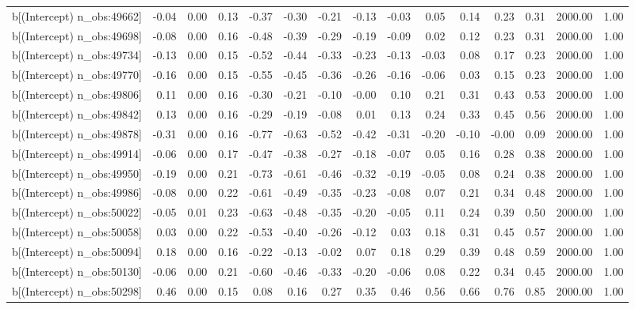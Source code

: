 \begin{table}[ht]
\begin{tabular}{rrrrrrrrrrrrrrr}
  b[(Intercept) n\_obs:49662] & -0.04 & 0.00 & 0.13 & -0.37 & -0.30 & -0.21 & -0.13 & -0.03 & 0.05 & 0.14 & 0.23 & 0.31 & 2000.00 & 1.00 \\ 
  b[(Intercept) n\_obs:49698] & -0.08 & 0.00 & 0.16 & -0.48 & -0.39 & -0.29 & -0.19 & -0.09 & 0.02 & 0.12 & 0.23 & 0.31 & 2000.00 & 1.00 \\ 
  b[(Intercept) n\_obs:49734] & -0.13 & 0.00 & 0.15 & -0.52 & -0.44 & -0.33 & -0.23 & -0.13 & -0.03 & 0.08 & 0.17 & 0.23 & 2000.00 & 1.00 \\ 
  b[(Intercept) n\_obs:49770] & -0.16 & 0.00 & 0.15 & -0.55 & -0.45 & -0.36 & -0.26 & -0.16 & -0.06 & 0.03 & 0.15 & 0.23 & 2000.00 & 1.00 \\ 
  b[(Intercept) n\_obs:49806] & 0.11 & 0.00 & 0.16 & -0.30 & -0.21 & -0.10 & -0.00 & 0.10 & 0.21 & 0.31 & 0.43 & 0.53 & 2000.00 & 1.00 \\ 
  b[(Intercept) n\_obs:49842] & 0.13 & 0.00 & 0.16 & -0.29 & -0.19 & -0.08 & 0.01 & 0.13 & 0.24 & 0.33 & 0.45 & 0.56 & 2000.00 & 1.00 \\ 
  b[(Intercept) n\_obs:49878] & -0.31 & 0.00 & 0.16 & -0.77 & -0.63 & -0.52 & -0.42 & -0.31 & -0.20 & -0.10 & -0.00 & 0.09 & 2000.00 & 1.00 \\ 
  b[(Intercept) n\_obs:49914] & -0.06 & 0.00 & 0.17 & -0.47 & -0.38 & -0.27 & -0.18 & -0.07 & 0.05 & 0.16 & 0.28 & 0.38 & 2000.00 & 1.00 \\ 
  b[(Intercept) n\_obs:49950] & -0.19 & 0.00 & 0.21 & -0.73 & -0.61 & -0.46 & -0.32 & -0.19 & -0.05 & 0.08 & 0.24 & 0.38 & 2000.00 & 1.00 \\ 
  b[(Intercept) n\_obs:49986] & -0.08 & 0.00 & 0.22 & -0.61 & -0.49 & -0.35 & -0.23 & -0.08 & 0.07 & 0.21 & 0.34 & 0.48 & 2000.00 & 1.00 \\ 
  b[(Intercept) n\_obs:50022] & -0.05 & 0.01 & 0.23 & -0.63 & -0.48 & -0.35 & -0.20 & -0.05 & 0.11 & 0.24 & 0.39 & 0.50 & 2000.00 & 1.00 \\ 
  b[(Intercept) n\_obs:50058] & 0.03 & 0.00 & 0.22 & -0.53 & -0.40 & -0.26 & -0.12 & 0.03 & 0.18 & 0.31 & 0.45 & 0.57 & 2000.00 & 1.00 \\ 
  b[(Intercept) n\_obs:50094] & 0.18 & 0.00 & 0.16 & -0.22 & -0.13 & -0.02 & 0.07 & 0.18 & 0.29 & 0.39 & 0.48 & 0.59 & 2000.00 & 1.00 \\ 
  b[(Intercept) n\_obs:50130] & -0.06 & 0.00 & 0.21 & -0.60 & -0.46 & -0.33 & -0.20 & -0.06 & 0.08 & 0.22 & 0.34 & 0.45 & 2000.00 & 1.00 \\ 
  b[(Intercept) n\_obs:50298] & 0.46 & 0.00 & 0.15 & 0.08 & 0.16 & 0.27 & 0.35 & 0.46 & 0.56 & 0.66 & 0.76 & 0.85 & 2000.00 & 1.00 \\ 

\end{tabular}
\end{table}
